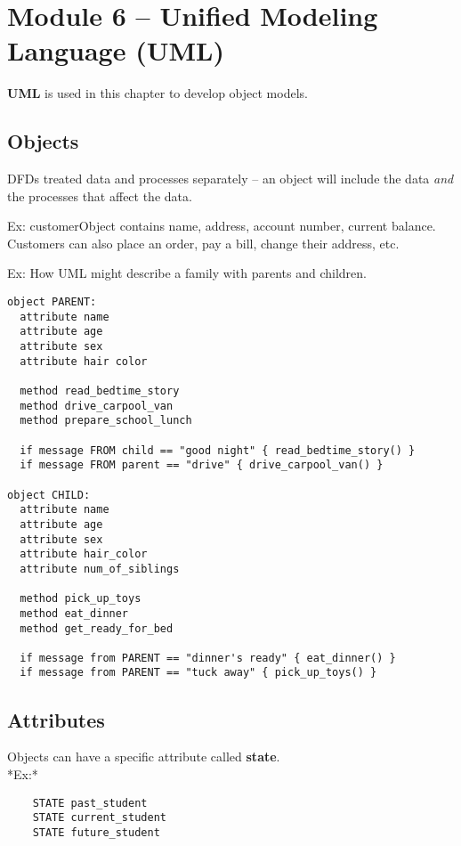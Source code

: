 \documentclass[12pt,a4paper]{article}
\begin{document}
\section*{Module 6 -- Unified Modeling Language (UML)}
\textbf{UML} is used in this chapter to develop object models.

\setcounter{section}{6}
\setcounter{subsection}{1}
\subsection{Objects}
DFDs treated data and processes separately -- an object will include the data \textit{and} the processes that affect the data.

\noindent Ex: customerObject contains name, address, account number, current balance. Customers can also place an order, pay a bill, change their address, etc.

\noindent Ex: How UML might describe a family with parents and children.
\begin{verbatim}
object PARENT:
  attribute name
  attribute age
  attribute sex
  attribute hair color

  method read_bedtime_story
  method drive_carpool_van
  method prepare_school_lunch

  if message FROM child == "good night" { read_bedtime_story() }
  if message FROM parent == "drive" { drive_carpool_van() }

object CHILD:
  attribute name
  attribute age
  attribute sex
  attribute hair_color
  attribute num_of_siblings

  method pick_up_toys
  method eat_dinner
  method get_ready_for_bed

  if message from PARENT == "dinner's ready" { eat_dinner() }
  if message from PARENT == "tuck away" { pick_up_toys() }
\end{verbatim}

\subsection{Attributes}
Objects can have a specific attribute called \textbf{state}. \\
*Ex:*
\begin{verbatim}
    STATE past_student
    STATE current_student
    STATE future_student
\end{verbatim}
\end{document}
